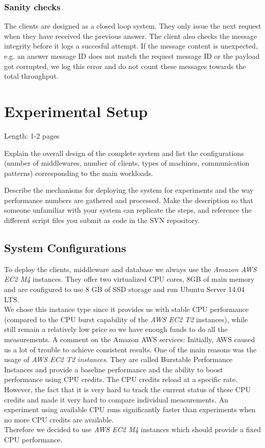 \documentclass[11pt]{article}
\begin{document}
\subsubsection{Sanity checks}\label{sec:sanity-checks}
The clients are designed as a closed loop system. They only issue the next request when they have received the previous answer. The client also checks the message integrity before it logs a succesful attempt. If the message content is unexpected, e.g. an answer message ID does not match the request message ID or the payload got corrupted, we log this error and do not count these messages towards the total throughput.
\section{Experimental Setup}\label{sec:experimental-setup}

Length: 1-2 pages

Explain the overall design of the complete system and list the
configurations (number of middlewares, number of clients, types of
machines, communication patterns) corresponding to the main workloads.

Describe the mechanisms for deploying the system for experiments and the
way performance numbers are gathered and processed. Make the description
so that someone unfamiliar with your system can replicate the steps, and
reference the different script files you submit as code in the SVN
repository.

\subsection{System Configurations}\label{sec:system-configurations}
To deploy the clients, middleware and database we always use the \textit{Amazon AWS EC2 M4} instances. They offer two virtualized CPU cores, 8GB of main memory and are configured to use 8 GB of SSD storage and run Ubuntu Server 14.04 LTS.\\
We chose this instance type since it provides us with stable CPU performance (compared to the CPU burst capability of the \textit{AWS EC2 T2} instances), while still remain a relatively low price so we have enough funds to do all the measurements.
A comment on the Amazon AWS services:
Initially, AWS caused us a lot of trouble to achieve consistent results. One of the main reasons was the usage of \textit{AWS EC2 T2 instances}. They are called Burstable Performance Instances and provide a baseline performance and the ability to boost performance using CPU credits. The CPU credits reload at a specific rate. However, the fact that it is very hard to track the current status of these CPU credits and made it very hard to compare individual measurements. An experiment using available CPU runs significantly faster than experiments when no more CPU credits are available.\\
Therefore we decided to use \textit{AWS EC2 M4} instances which should provide a fixed CPU performance.
\end{document}
